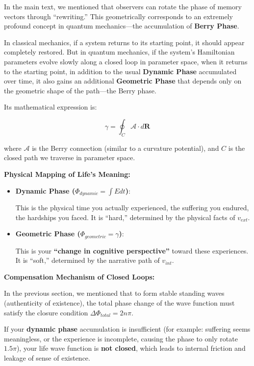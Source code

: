 In the main text, we mentioned that observers can rotate the phase of memory vectors through ``rewriting.'' This geometrically corresponds to an extremely profound concept in quantum mechanics---the accumulation of \textbf{Berry Phase}.

In classical mechanics, if a system returns to its starting point, it should appear completely restored. But in quantum mechanics, if the system's Hamiltonian parameters evolve slowly along a closed loop in parameter space, when it returns to the starting point, in addition to the usual \textbf{Dynamic Phase} accumulated over time, it also gains an additional \textbf{Geometric Phase} that depends only on the geometric shape of the path---the Berry phase.

Its mathematical expression is:

\[\gamma = \oint_C \mathcal{A} \cdot d\mathbf{R}\]

where $\mathcal{A}$ is the Berry connection (similar to a curvature potential), and $C$ is the closed path we traverse in parameter space.

\textbf{Physical Mapping of Life's Meaning:}

\begin{itemize}
\item \textbf{Dynamic Phase ($\Phi_{dynamic} = \int E dt$)}:

This is the physical time you actually experienced, the suffering you endured, the hardships you faced. It is ``hard,'' determined by the physical facts of $v_{ext}$.

\item \textbf{Geometric Phase ($\Phi_{geometric} = \gamma$)}:

This is your \textbf{``change in cognitive perspective''} toward these experiences. It is ``soft,'' determined by the narrative path of $v_{int}$.
\end{itemize}

\textbf{Compensation Mechanism of Closed Loops:}

In the previous section, we mentioned that to form stable standing waves (authenticity of existence), the total phase change of the wave function must satisfy the closure condition $\Delta \Phi_{total} = 2n\pi$.

If your \textbf{dynamic phase} accumulation is insufficient (for example: suffering seems meaningless, or the experience is incomplete, causing the phase to only rotate $1.5\pi$), your life wave function is \textbf{not closed}, which leads to internal friction and leakage of sense of existence.

